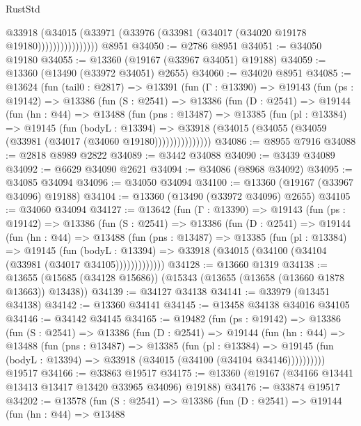 \begin{lexlean}{RustStd}
\begin{coremodule}
                      @33918
                        (@34015
                          (@33971 (@33976 (@33981 (@34017 (@34020 @19178 @19180))))))))))))))))
    @8951
@34050 := @2786 @8951
@34051 := @34050 @19180
@34055 := @13360 (@19167 (@33967 @34051) @19188)
@34059 := @13360 (@13490 (@33972 @34051) @2655)
@34060 := @34020 @8951
@34085 := @13624
    (fun (tail0 : @2817) =>
    @13391
      (fun (Γ : @13390) =>
      @19143
        (fun (ps : @19142) =>
        @13386
          (fun (S : @2541) =>
          @13386
            (fun (D : @2541) =>
            @19144
              (fun (hn : @44) =>
              @13488
                (fun (pns : @13487) =>
                @13385
                  (fun (pl : @13384) =>
                  @19145
                    (fun (bodyL : @13394) =>
                    @33918 (@34015 (@34055 (@34059 (@33981 (@34017 (@34060 @19180)))))))))))))))
@34086 := @8955 @7916
@34088 := @2818 @8989 @2822
@34089 := @3442 @34088
@34090 := @3439 @34089
@34092 := @6629 @34090 @2621
@34094 := @34086 (@8968 @34092)
@34095 := @34085 @34094
@34096 := @34050 @34094
@34100 := @13360 (@19167 (@33967 @34096) @19188)
@34104 := @13360 (@13490 (@33972 @34096) @2655)
@34105 := @34060 @34094
@34127 := @13642
    (fun (Γ : @13390) =>
    @19143
      (fun (ps : @19142) =>
      @13386
        (fun (S : @2541) =>
        @13386
          (fun (D : @2541) =>
          @19144
            (fun (hn : @44) =>
            @13488
              (fun (pns : @13487) =>
              @13385
                (fun (pl : @13384) =>
                @19145
                  (fun (bodyL : @13394) =>
                  @33918 (@34015 (@34100 (@34104 (@33981 (@34017 @34105)))))))))))))
@34128 := @13660 @1319
@34138 := @13655 (@15685 (@34128 @15686)) (@15343 (@13655 (@13658 (@13660 @1878 @13663)) @13438))
@34139 := @34127 @34138
@34141 := @33979 (@13451 @34138)
@34142 := @13360 @34141
@34145 := @13458 @34138 @34016 @34105
@34146 := @34142 @34145
@34165 := @19482
    (fun (ps : @19142) =>
    @13386
      (fun (S : @2541) =>
      @13386
        (fun (D : @2541) =>
        @19144
          (fun (hn : @44) =>
          @13488
            (fun (pns : @13487) =>
            @13385
              (fun (pl : @13384) =>
              @19145 (fun (bodyL : @13394) => @33918 (@34015 (@34100 (@34104 @34146))))))))))
    @19517
@34166 := @33863 @19517
@34175 := @13360 (@19167 (@34166 @13441 @13413 @13417 @13420 @33965 @34096) @19188)
@34176 := @33874 @19517
@34202 := @13578
    (fun (S : @2541) =>
    @13386
      (fun (D : @2541) =>
      @19144
        (fun (hn : @44) =>
        @13488

\end{coremodule}
\end{lexlean}
